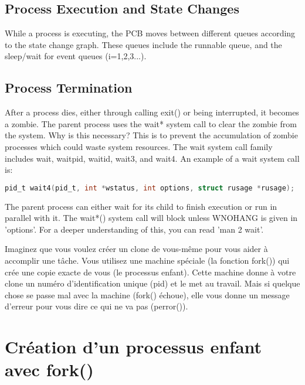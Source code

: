 \documentclass[12pt]{report}
\begin{document}
\subsection{Process Execution and State Changes}

While a process is executing, the PCB moves between different queues according to the state change graph. These queues include the runnable queue, and the sleep/wait for event queues (i=1,2,3...).

\subsection{Process Termination}

After a process dies, either through calling exit() or being interrupted, it becomes a zombie. The parent process uses the wait* system call to clear the zombie from the system. Why is this necessary? This is to prevent the accumulation of zombie processes which could waste system resources. The wait system call family includes wait, waitpid, waitid, wait3, and wait4. An example of a wait system call is: 

\begin{lstlisting}[language=C]
pid_t wait4(pid_t, int *wstatus, int options, struct rusage *rusage);
\end{lstlisting}

The parent process can either wait for its child to finish execution or run in parallel with it. The wait*() system call will block unless WNOHANG is given in 'options'. For a deeper understanding of this, you can read 'man 2 wait'.

\begin{tcolorbox}[
     colback=blue!10,
     colframe=blue,
     title={\fontfamily{lmr}\selectfont \\faComment\ Vulgarisation simple},
     fonttitle=\bfseries,
     fontupper=\fontfamily{lmr}\selectfont,
     boxrule=1pt,
     sharp corners,
     ]
Imaginez que vous voulez créer un clone de vous-même pour vous aider à accomplir une tâche. Vous utilisez une machine spéciale (la fonction fork()) qui crée une copie exacte de vous (le processus enfant). Cette machine donne à votre clone un numéro d'identification unique (pid) et le met au travail. Mais si quelque chose se passe mal avec la machine (fork() échoue), elle vous donne un message d'erreur pour vous dire ce qui ne va pas (perror()).
\end{tcolorbox}
\section{Création d'un processus enfant avec fork()} 
\end{document}
